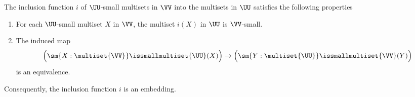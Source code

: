 \begin{prp}\label{prp:is-embedding-inclusion-small-multisets}
  The inclusion function $i$ of $\UU$-small multisets in $\VV$ into the multisets in $\UU$ satisfies the following properties
  \begin{enumerate}
  \item For each $\UU$-small multiset $X$ in $\VV$, the multiset $i(X)$ in $\UU$ is $\VV$-small.
  \item The induced map
    \begin{equation*}
      \Big(\sm{X:\multiset{\VV}}\issmallmultiset{\UU}(X)\Big)\to\Big(\sm{Y:\multiset{\UU}}\issmallmultiset{\VV}(Y)\Big)
    \end{equation*}
    is an equivalence.
  \end{enumerate}
  Consequently, the inclusion function $i$ is an embedding.
\end{prp}

